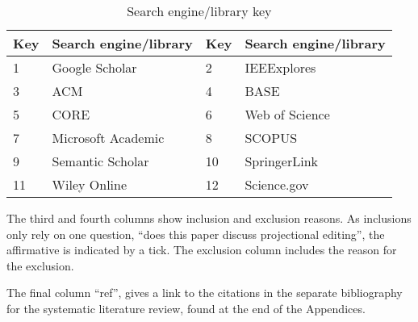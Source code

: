 \begin{table}[h]
    \begin{center}
        \begin{tabular}{ | l | l | l | l |} 
            \hline
            Key & Search engine/library    & Key & Search engine/library     \\
            \hline
            \hline
            1  & Google Scholar            & 2  & IEEExplores                \\
            3  & ACM                       & 4  & BASE                       \\
            5  & CORE                      & 6  & Web of Science             \\
            7  & Microsoft Academic        & 8  & SCOPUS                     \\
            9  & Semantic Scholar          & 10 & SpringerLink               \\
            11 & Wiley Online              & 12 & Science.gov                \\
            \hline
        \end{tabular}
    \end{center}
    \caption{Search engine/library key}
    \label{table:SearchEngineKey}
\end{table}

The third and fourth columns show inclusion and exclusion reasons.
As inclusions only rely on one question, ``does this paper discuss projectional editing'', the affirmative is indicated by a tick.
The exclusion column includes the reason for  the exclusion.

The final column ``ref'', gives a link to the citations in the separate bibliography for the systematic literature review, found at the end of the Appendices.

